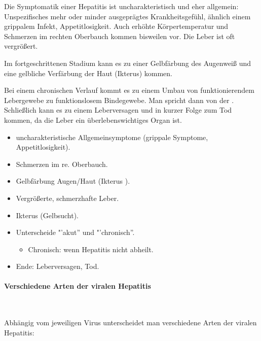 {%
Die Symptomatik einer Hepatitis ist
uncharakteristisch und eher allgemein: Unspezifisches mehr oder minder
ausgeprägtes Krankheitsgefühl, ähnlich einem grippalem Infekt, Appetitlosigkeit.
Auch erhöhte Körpertemperatur und Schmerzen im
rechten Oberbauch kommen bisweilen vor. Die Leber ist oft
vergrößert.

Im
fortgeschrittenen Stadium kann es zu einer Gelbfärbung
des Augenweiß und eine gelbliche Verfärbung der Haut
(Ikterus) kommen. 

Bei einem chronischen
Verlauf kommt es zu einem Umbau von
funktionierendem Lebergewebe zu
funktionslosem Bindegewebe. Man spricht
dann von der
\label{topic:leberzirrhose}.
Schließlich kann es zu einem Leberversagen und in kurzer
Folge zum Tod kommen, da die Leber ein überlebenswichtiges
Organ ist. 
}{
\begin{itemize}
  \item uncharakteristische Allgemeinsymptome (grippale Symptome,
  Appetitlosigkeit).
  \item Schmerzen im re. Oberbauch.
  \item Gelbfärbung Augen/Haut (Ikterus ).
  \item Vergrößerte, schmerzhafte Leber.
  \item Ikterus (Gelbsucht).
  \item Unterscheide "'akut{\textquotedblright} und
  "'chronisch{\textquotedblright}.
  \begin{itemize}
    \item Chronisch: wenn Hepatitis nicht abheilt.
  \end{itemize}
  \item Ende: Leberversagen, Tod.
\end{itemize}
}{}{}{}



\paragraph{Verschiedene Arten der viralen Hepatitis}~

Abhängig vom jeweiligen Virus unterscheidet man
verschiedene Arten der viralen Hepatitis:

